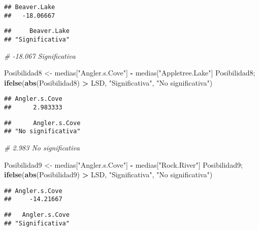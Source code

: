 \documentclass[
]{article}
\newenvironment{Shaded}{\begin{snugshade}}{\end{snugshade}}
\newcommand{\CommentTok}[1]{\textcolor[rgb]{0.56,0.35,0.01}{\textit{#1}}}
\newcommand{\FunctionTok}[1]{\textcolor[rgb]{0.13,0.29,0.53}{\textbf{#1}}}
\newcommand{\NormalTok}[1]{#1}
\newcommand{\OtherTok}[1]{\textcolor[rgb]{0.56,0.35,0.01}{#1}}
\newcommand{\SpecialCharTok}[1]{\textcolor[rgb]{0.81,0.36,0.00}{\textbf{#1}}}
\newcommand{\StringTok}[1]{\textcolor[rgb]{0.31,0.60,0.02}{#1}}
\begin{document}
\begin{verbatim}
## Beaver.Lake 
##   -18.06667
\end{verbatim}

\begin{verbatim}
##     Beaver.Lake 
## "Significativa"
\end{verbatim}

\begin{Shaded}
\begin{Highlighting}[]
\CommentTok{\# {-}18.067 Significativa}

\NormalTok{Posibilidad8 }\OtherTok{\textless{}{-}}\NormalTok{ medias[}\StringTok{"Angler.s.Cove"}\NormalTok{] }\SpecialCharTok{{-}}\NormalTok{ medias[}\StringTok{"Appletree.Lake"}\NormalTok{]}
\NormalTok{Posibilidad8; }\FunctionTok{ifelse}\NormalTok{(}\FunctionTok{abs}\NormalTok{(Posibilidad8) }\SpecialCharTok{\textgreater{}}\NormalTok{ LSD, }\StringTok{"Significativa"}\NormalTok{, }\StringTok{"No significativa"}\NormalTok{)}
\end{Highlighting}
\end{Shaded}

\begin{verbatim}
## Angler.s.Cove 
##      2.983333
\end{verbatim}

\begin{verbatim}
##      Angler.s.Cove 
## "No significativa"
\end{verbatim}

\begin{Shaded}
\begin{Highlighting}[]
\CommentTok{\# 2.983 No significativa}

\NormalTok{Posibilidad9 }\OtherTok{\textless{}{-}}\NormalTok{ medias[}\StringTok{"Angler.s.Cove"}\NormalTok{] }\SpecialCharTok{{-}}\NormalTok{ medias[}\StringTok{"Rock.River"}\NormalTok{]}
\NormalTok{Posibilidad9; }\FunctionTok{ifelse}\NormalTok{(}\FunctionTok{abs}\NormalTok{(Posibilidad9) }\SpecialCharTok{\textgreater{}}\NormalTok{ LSD, }\StringTok{"Significativa"}\NormalTok{, }\StringTok{"No significativa"}\NormalTok{)}
\end{Highlighting}
\end{Shaded}

\begin{verbatim}
## Angler.s.Cove 
##     -14.21667
\end{verbatim}

\begin{verbatim}
##   Angler.s.Cove 
## "Significativa"
\end{verbatim}
\end{document}
